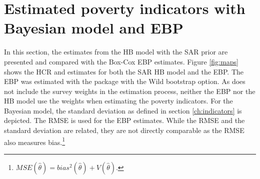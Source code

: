 \section{Estimated poverty indicators with Bayesian model and EBP}
In this section, the estimates from the HB model with the SAR prior are presented and compared with the Box-Cox EBP estimates.
Figure \ref{fig:maps} shows the HCR and estimates for both the SAR HB model and the EBP.
The EBP was estimated with the  package \citep{kreutzmann_r_2019} with the Wild bootstrap option.
As  does not include the survey weights in the estimation process, neither the EBP nor the HB model use the weights when estimating the poverty indicators. %
For the Bayesian model, the standard deviation as defined in section \ref{ch:indicators} is depicted.
The RMSE is used for the EBP estimates.
While the RMSE and the standard deviation are related, they are not directly comparable as the RMSE also measures bias.\footnote{$MSE(\hat \theta) = bias^2(\hat \theta) + V(\hat \theta).$}


